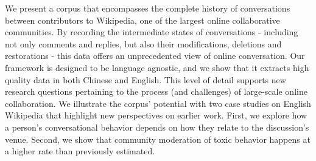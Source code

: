 We present a corpus that encompasses the complete history of conversations between contributors to Wikipedia, one of the largest online collaborative communities. By recording the intermediate states of conversations - including not only comments and replies, but also their modifications, deletions and restorations - this data offers an unprecedented view of online conversation. Our framework is designed to be language agnostic, and we show that it extracts high quality data in both Chinese and English. This level of detail supports new research questions pertaining to the process (and challenges) of large-scale online collaboration. We illustrate the corpus' potential with two case studies on English Wikipedia that highlight new perspectives on earlier work. First, we explore how a person's conversational behavior depends on how they relate to the discussion's venue. Second, we show that community moderation of toxic behavior happens at a higher rate than previously estimated.
